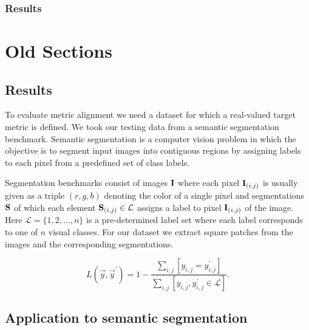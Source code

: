\subsection{Results}





\chapter*{Old Sections}


\section{Results}

To evaluate metric alignment we need a dataset for which a real-valued target metric is defined. We took our testing data from a semantic segmentation benchmark. Semantic segmentation is a computer vision problem in which the objective is to segment input images into contiguous regions by assigning labels to each pixel from a predefined set of class labels. 


Segmentation benchmarks consist of images $\mathbf{I}$ where each pixel $\mathbf{I}_{(i,j)}$ is usually given as a triple $(r,g,b)$ denoting the color of a single pixel and segmentations $\mathbf{S}$ of which each element  $\mathbf{S}_{(i,j)} \in \mathcal{L}$ assigns a label to pixel $\mathbf{I}_{(i,j)}$ of the image. Here $\mathcal{L} = \{1, 2, \ldots, n\}$ is a pre-determined label set  where each label corresponds to one of $n$ visual classes. For our dataset we extract square patches from the images and the corresponding segmentations.


\begin{equation}
L(\vec{y}, \vec{y}^\prime) = 1 - \frac{\sum_{i,j} \left [ y_{i,j} = y^\prime_{i,j}\right]}{\sum_{i,j} \left [y_{i,j}, y^\prime_{i,j} \in \mathcal{L}\right ]}.
\label{eq:patch_loss}
\end{equation}



\section{Application to semantic segmentation}





